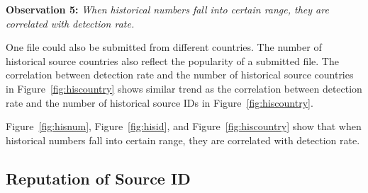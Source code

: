 

{\bf Observation 5:} 
{\em {\color{red} When historical numbers fall into certain range, they are correlated with detection rate. }}

One file could also be submitted from different countries. 
The number of historical source countries also reflect the popularity of a submitted file. 
The correlation between detection rate and the number of historical source countries in 
Figure~\ref{fig:hiscountry} shows similar trend as the correlation between detection rate 
and the number of historical source IDs in Figure~\ref{fig:hiscountry}. 

Figure~\ref{fig:hisnum}, Figure~\ref{fig:hisid}, and Figure~\ref{fig:hiscountry} show that 
when historical numbers fall into certain range, they are correlated with detection rate. 
\fi

\subsection{Reputation of Source ID}
\label{sec:reputation}

